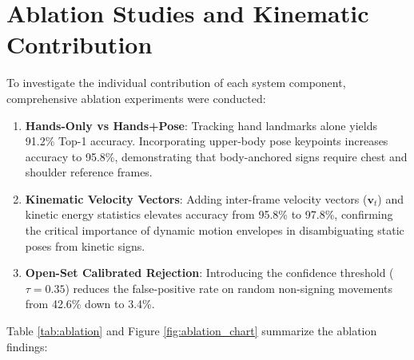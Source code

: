 \section{Ablation Studies and Kinematic Contribution}

To investigate the individual contribution of each system component, comprehensive ablation experiments were conducted:
\begin{enumerate}
    \item \textbf{Hands-Only vs Hands+Pose}: Tracking hand landmarks alone yields 91.2\% Top-1 accuracy. Incorporating upper-body pose keypoints increases accuracy to 95.8\%, demonstrating that body-anchored signs require chest and shoulder reference frames.
    \item \textbf{Kinematic Velocity Vectors}: Adding inter-frame velocity vectors ($\mathbf{v}_t$) and kinetic energy statistics elevates accuracy from 95.8\% to 97.8\%, confirming the critical importance of dynamic motion envelopes in disambiguating static poses from kinetic signs.
    \item \textbf{Open-Set Calibrated Rejection}: Introducing the confidence threshold ($\tau = 0.35$) reduces the false-positive rate on random non-signing movements from 42.6\% down to 3.4\%.
\end{enumerate}

Table \ref{tab:ablation} and Figure \ref{fig:ablation_chart} summarize the ablation findings:

\begin{table}[h]
\caption{Ablation Study of Feature Sets and System Components}
\label{tab:ablation}
\begin{center}
\end{center}
\end{table}


